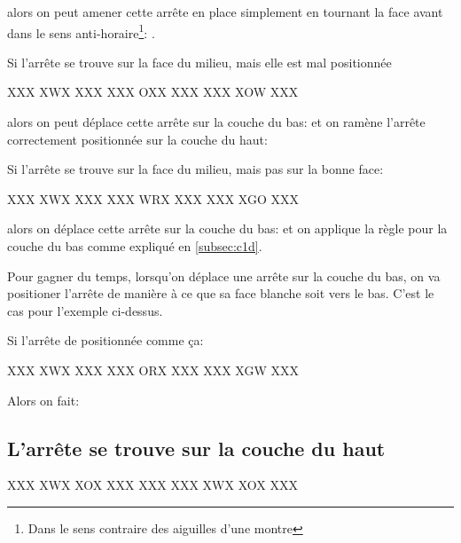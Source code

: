 \documentclass[10pt,paper=a5,pagesize]{scrbook}
\begin{document}
alors on peut amener cette arrête en place simplement en tournant la face avant dans le sens anti-horaire\footnote{Dans le sens contraire des aiguilles d'une montre}: .

Si l'arrête se trouve sur la face du milieu, mais elle est mal positionnée

\begin{center}
	\RubikFaceUp%
	{X}{X}{X}%
	{X}{W}{X}%
	{X}{X}{X}
	\RubikFaceRight%
	{X}{X}{X}%
	{O}{X}{X}%
	{X}{X}{X}
	\RubikFaceFront%
	{X}{X}{X}%
	{X}{O}{W}%
	{X}{X}{X}
\end{center}

alors on peut déplace cette arrête sur la couche du bas:  et on ramène l'arrête correctement positionnée sur la couche du haut: 


Si l'arrête se trouve sur la face du milieu, mais pas sur la bonne face:

\begin{center}
	\RubikFaceUp%
	{X}{X}{X}%
	{X}{W}{X}%
	{X}{X}{X}
	\RubikFaceRight%
	{X}{X}{X}%
	{W}{R}{X}%
	{X}{X}{X}
	\RubikFaceFront%
	{X}{X}{X}%
	{X}{G}{O}%
	{X}{X}{X}
\end{center}

alors on déplace cette arrête sur la couche du bas:  et on applique la règle pour la couche du bas comme expliqué en \ref{subsec:c1d}.


Pour gagner du temps, lorsqu'on déplace une arrête sur la couche du bas, on va positioner l'arrête de manière à ce que sa face blanche soit vers le bas. C'est le cas pour l'exemple ci-dessus.

Si l'arrête de positionnée comme ça:

\begin{center}
	\RubikFaceUp%
	{X}{X}{X}%
	{X}{W}{X}%
	{X}{X}{X}
	\RubikFaceRight%
	{X}{X}{X}%
	{O}{R}{X}%
	{X}{X}{X}
	\RubikFaceFront%
	{X}{X}{X}%
	{X}{G}{W}%
	{X}{X}{X}
\end{center}

Alors on fait: 

\subsection{L'arrête se trouve sur la couche du haut}

\begin{center}
	\RubikFaceUp%
	{X}{X}{X}%
	{X}{W}{X}%
	{X}{O}{X}
	\RubikFaceRight%
	{X}{X}{X}%
	{X}{X}{X}%
	{X}{X}{X}
	\RubikFaceFront%
	{X}{W}{X}%
	{X}{O}{X}%
	{X}{X}{X}
\end{center}
\end{document}
